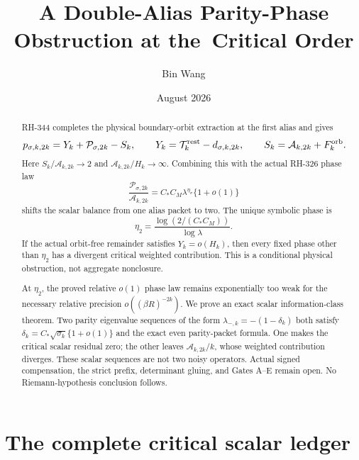 \documentclass[11pt]{article}
\title{A Double-Alias Parity-Phase Obstruction at the\
Critical Order}
\author{Bin Wang}
\date{August 2026}
\theoremstyle{remark}
\newcommand{\cP}{\mathcal P}
\newcommand{\cA}{\mathcal A}
\begin{document}
\maketitle

\begin{abstract}
RH-344 completes the physical boundary-orbit extraction at the first alias
and gives
\[
 p_{\sigma,k,2k}=Y_k+\cP_{\sigma,2k}-S_k,
 \qquad
 Y_k=\mathcal T_k^{\rm rest}-d_{\sigma,k,2k},
 \qquad
 S_k=\cA_{k,2k}+F_k^{\rm orb}.
\]
Here $S_k/\cA_{k,2k}\to2$ and $\cA_{k,2k}/H_k\to\infty$.  Combining this
with the actual RH-326 phase law
\[
 \frac{\cP_{\sigma,2k}}{\cA_{k,2k}}
 =C_*C_M\lambda^{\eta_\sigma}\{1+o(1)\}
\]
shifts the scalar balance from one alias packet to two.  The unique symbolic
phase is
\[
 \eta_2=\frac{\log(2/(C_*C_M))}{\log\lambda}.
\]
If the actual orbit-free remainder satisfies $Y_k=o(H_k)$, then every fixed
phase other than $\eta_2$ has a divergent critical weighted contribution.
This is a conditional physical obstruction, not aggregate nonclosure.

At $\eta_2$, the proved relative $o(1)$ phase law remains exponentially too
weak for the necessary relative precision $o((\beta R)^{-2k})$.  We prove an
exact scalar information-class theorem.  Two parity eigenvalue sequences of
the form $\lambda_{-,k}=-(1-\delta_k)$ both satisfy
$\delta_k=C_*\sqrt{\sigma_k}\{1+o(1)\}$ and the exact even parity-packet
formula.  One makes the critical scalar residual zero; the other leaves
$\cA_{k,2k}/k$, whose weighted contribution diverges.  These scalar sequences
are not two noisy operators.  Actual signed compensation, the strict prefix,
determinant gluing, and Gates A--E remain open.  No Riemann-hypothesis
conclusion follows.
\end{abstract}

\section{The complete critical scalar ledger}
\end{document}

